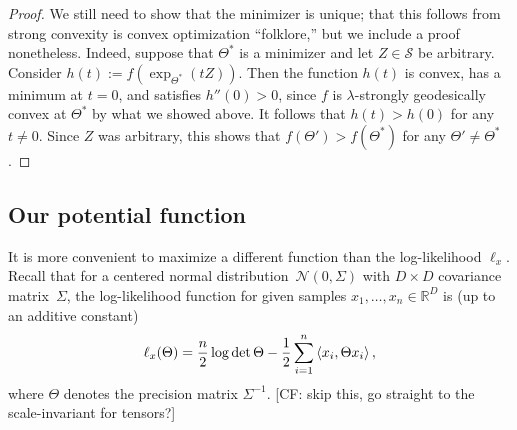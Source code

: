 \documentclass{article}
\newcommand{\R}{{\mathbb{R}}}
\newcommand\cN{\mathcal{N}}
\newcommand\Sym{\mathcal{S}}
\newcommand\samp{x}
\newcommand{\CF}[1]{{\color{purple}[CF: #1]}}
\begin{document}
\begin{proof}

We still need to show that the minimizer is unique; that this follows from strong convexity is convex optimization ``folklore,'' but we include a proof nonetheless. Indeed, suppose that $\Theta^*$ is a minimizer and let $Z\in \Sym$ be arbitrary.
Consider $h(t) := f(\exp_{\Theta^*}(tZ))$.
Then the function $h(t)$ is convex, has a minimum at $t=0$, and satisfies $h''(0) > 0$, since $f$ is $\lambda$-strongly geodesically convex at $\Theta^*$ by what we showed above.
It follows that $h(t) > h(0)$ for any $t\neq0$.
Since $Z$ was arbitrary, this shows that $f(\Theta') > f(\Theta^*)$ for any $\Theta'\neq\Theta^*$.
\end{proof}


\subsection{Our potential function}



It is more convenient to maximize a different function than the log-likelihood $\ell_{\samp}$. Recall that for a centered normal distribution~$\cN(0,\Sigma)$ with $D\times D$ covariance matrix~$\Sigma$, the log-likelihood function for given samples $\samp_1,\dots,\samp_n\in\R^D$ is (up to an additive constant)
\begin{align*}
  \ell_{\samp}(\Theta)
  = \frac n2 \log \det \Theta - \frac12 \sum_{i=1}^n \braket{\samp_i, \Theta \samp_i},
\end{align*}
where $\Theta$ denotes the precision matrix $\Sigma^{-1}$. \CF{skip this, go straight to the scale-invariant for tensors?}
\end{document}

